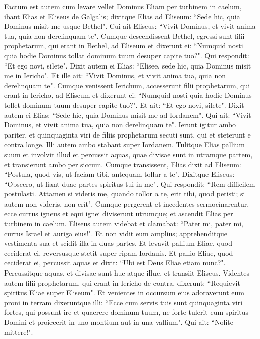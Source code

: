 \begin{biblechapter}  
\verse Factum est autem cum levare vellet Dominus Eliam per turbinem in caelum, ibant Elias et Eliseus de Galgalis; 
\verse dixitque Elias ad Eliseum: “Sede hic, quia Dominus misit me usque Bethel". Cui ait Eliseus: “Vivit Dominus, et vivit anima tua, quia non derelinquam te". Cumque descendissent Bethel, 
\verse egressi sunt filii prophetarum, qui erant in Bethel, ad Eliseum et dixerunt ei: “Numquid nosti quia hodie Dominus tollat dominum tuum desuper capite tuo?". Qui respondit: “Et ego novi, silete". 
\verse Dixit autem ei Elias: “Elisee, sede hic, quia Dominus misit me in Iericho". Et ille ait: “Vivit Dominus, et vivit anima tua, quia non derelinquam te". Cumque venissent Ierichum, 
\verse accesserunt filii prophetarum, qui erant in Iericho, ad Eliseum et dixerunt ei: “Numquid nosti quia hodie Dominus tollet dominum tuum desuper capite tuo?". Et ait: “Et ego novi, silete". 
\verse Dixit autem ei Elias: “Sede hic, quia Dominus misit me ad Iordanem". Qui ait: “Vivit Dominus, et vivit anima tua, quia non derelinquam te". Ierunt igitur ambo pariter, 
\verse et quinquaginta viri de filiis prophetarum secuti sunt, qui et steterunt e contra longe. Illi autem ambo stabant super Iordanem. 
\verse Tulitque Elias pallium suum et involvit illud et percussit aquas, quae divisae sunt in utramque partem, et transierunt ambo per siccum. 
\verse Cumque transissent, Elias dixit ad Eliseum: “Postula, quod vis, ut faciam tibi, antequam tollar a te". Dixitque Eliseus: “Obsecro, ut fiant duae partes spiritus tui in me". 
\verse Qui respondit: “Rem difficilem postulasti. Attamen si videris me, quando tollor a te, erit tibi, quod petisti; si autem non videris, non erit". 
\verse Cumque pergerent et incedentes sermocinarentur, ecce currus igneus et equi ignei diviserunt utrumque; et ascendit Elias per turbinem in caelum. 
\verse Eliseus autem videbat et clamabat: “Pater mi, pater mi, currus Israel et auriga eius!". Et non vidit eum amplius; apprehenditque vestimenta sua et scidit illa in duas partes. 
\verse Et levavit pallium Eliae, quod ceciderat ei, reversusque stetit super ripam Iordanis. 
\verse Et pallio Eliae, quod ceciderat ei, percussit aquas et dixit: “Ubi est Deus Eliae etiam nunc?". Percussitque aquas, et divisae sunt huc atque illuc, et transiit Eliseus. 
\verse Videntes autem filii prophetarum, qui erant in Iericho de contra, dixerunt: “Requievit spiritus Eliae super Eliseum". Et venientes in occursum eius adoraverunt eum proni in terram 
\verse dixeruntque illi: “Ecce cum servis tuis sunt quinquaginta viri fortes, qui possunt ire et quaerere dominum tuum, ne forte tulerit eum spiritus Domini et proiecerit in uno montium aut in una vallium". Qui ait: “Nolite mittere!". 

\end{biblechapter}
